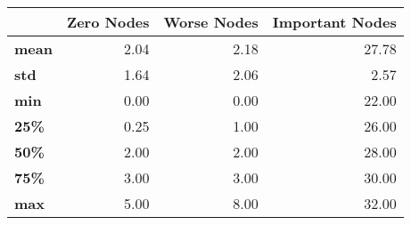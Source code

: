 \begin{tabular}{lrrr}
\toprule
{} &  Zero Nodes &  Worse Nodes &  Important Nodes \\
\midrule
\textbf{mean} &        2.04 &         2.18 &            27.78 \\
\textbf{std } &        1.64 &         2.06 &             2.57 \\
\textbf{min } &        0.00 &         0.00 &            22.00 \\
\textbf{25\% } &        0.25 &         1.00 &            26.00 \\
\textbf{50\% } &        2.00 &         2.00 &            28.00 \\
\textbf{75\% } &        3.00 &         3.00 &            30.00 \\
\textbf{max } &        5.00 &         8.00 &            32.00 \\
\bottomrule
\end{tabular}
